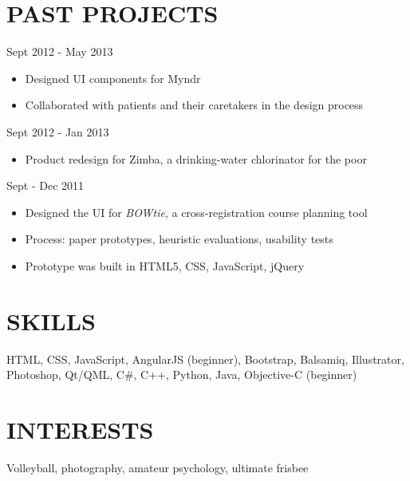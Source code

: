 \documentclass[margin]{res}
\begin{document}
 \vspace{3mm}

\section{PAST PROJECTS \\}


\hspace*{7mm}{ \bf Myndr iOS App: An Aid for Alzheimer's disease}   \hfill            Sept 2012 - May 2013\ 
	\smallskip
	\begin{itemize}  \itemsep -4pt %
	
	 \item Designed UI components for Myndr
	\item Collaborated with patients and their caretakers in the design process
	\end{itemize}


\hspace*{7mm}{ \bf Zimba, a Water Purifier in India}   \hfill            Sept 2012 - Jan 2013\ 
	\smallskip
	\begin{itemize}  \itemsep -4pt %
	
	 \item Product redesign for Zimba, a drinking-water chlorinator for the poor 
	\end{itemize}


\hspace*{7mm}{\bf Human Factors Interface Design} \hfill Sept - Dec 2011\
\smallskip
	\begin{itemize}  \itemsep -4pt %
		
	\item Designed the UI for {\emph {BOWtie}}, a cross-registration course planning tool
	\item Process: paper prototypes, heuristic evaluations, usability tests
	\item Prototype was built in HTML5, CSS, JavaScript, jQuery %
	\end{itemize}



\vspace*{9mm}

\section{SKILLS} \hspace*{7mm} HTML, CSS, JavaScript, AngularJS (beginner), Bootstrap, Balsamiq,  Illustrator, Photoshop, \smallskip \hspace*{7mm} Qt/QML, C\#, C++,  Python, Java, Objective-C (beginner)
\vspace*{-4mm}
\section {INTERESTS} \hspace*{7mm} Volleyball, photography, amateur psychology, ultimate frisbee
\end{document}
